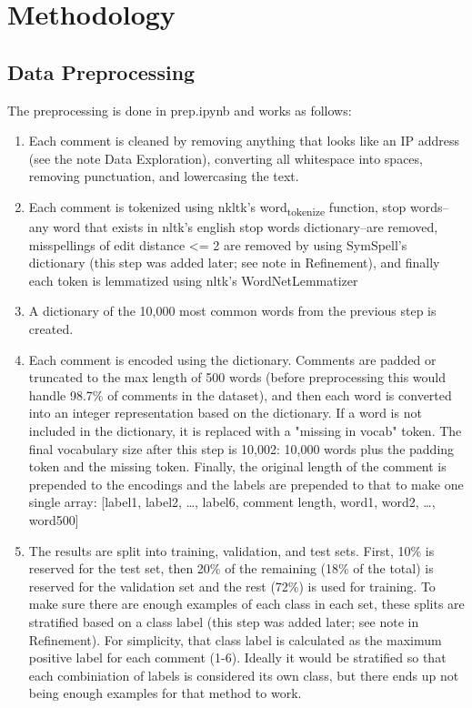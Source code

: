 \documentclass[12pt]{article}
\begin{document}
\section*{Methodology}
\label{sec:org99d4458}

\subsection*{Data Preprocessing}
\label{sec:org454c425}
The preprocessing is done in prep.ipynb and works as follows:
\begin{enumerate}
\item Each comment is cleaned by removing anything that looks like an IP address (see the note Data Exploration), converting all whitespace into spaces, removing punctuation, and lowercasing the text.
\item Each comment is tokenized using nkltk's word\textsubscript{tokenize} function, stop words--any word that exists in nltk's english stop words dictionary--are removed, misspellings of edit distance <= 2 are removed by using SymSpell's dictionary (this step was added later; see note in Refinement), and finally each token is lemmatized using nltk's WordNetLemmatizer
\item A dictionary of the 10,000 most common words from the previous step is created.
\item Each comment is encoded using the dictionary. Comments are padded or truncated to the max length of 500 words (before preprocessing this would handle 98.7\% of comments in the dataset), and then each word is converted into an integer representation based on the dictionary. If a word is not included in the dictionary, it is replaced with a "missing in vocab" token. The final vocabulary size after this step is 10,002: 10,000 words plus the padding token and the missing token. Finally, the original length of the comment is prepended to the encodings and the labels are prepended to that to make one single array: [label1, label2, \ldots{}, label6, comment length, word1, word2, \ldots{}, word500]
\item The results are split into training, validation, and test sets. First, 10\% is reserved for the test set, then 20\% of the remaining (18\% of the total) is reserved for the validation set and the rest (72\%) is used for training. To make sure there are enough examples of each class in each set, these splits are stratified based on a class label (this step was added later; see note in Refinement). For simplicity, that class label is calculated as the maximum positive label for each comment (1-6). Ideally it would be stratified so that each combiniation of labels is considered its own class, but there ends up not being enough examples for that method to work.
\end{enumerate}
\end{document}
